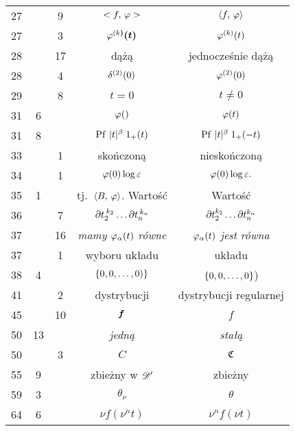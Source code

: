 \documentclass[a4paper,11pt]{article}
\begin{document}
\begin{center}
\begin{tabular}{|c|c|c|c|c|}
    27  & &  9 & $< f,\, \varphi >$ & $\langle  f ,\,  \varphi  \rangle$ \\
    27  & &  3 & $\varphi^{ ( k \boldsymbol{ ) } }\boldsymbol{ ( t ) } $
           & $\varphi^{ ( k ) }( t )$ \\
    28  & & 17 & dążą & jednocześnie dążą \\
    28  & &  4 & $\delta^{ ( 2 ) }( 0 )$ & $\varphi^{ ( 2 ) }( 0 )$ \\
    29  & &  8 & $t = 0$ & $t \neq 0$ \\
    31  &  6 & & $\varphi( )$ & $\varphi( t )$ \\
    31  &  8 & & $\mathrm{Pf}\, \, | t |^{ \beta } \; 1_{ + }( t )$
           & $\mathrm{Pf}\, \, | t |^{ \beta } \; 1_{ + }( -t )$ \\
    33  & &  1 & skończoną & nieskończoną \\
    34  & &  1 & $\varphi( 0 ) \log\varepsilon$ & $\varphi( 0 ) \log\varepsilon.$ \\
    35  &  1 & & tj.~$\langle  B ,\,  \varphi  \rangle$. Wartość & Wartość \\
    36  & &  7 & $\partial t_{ 2 }^{ \: k_{ 2 } } \ldots \partial t_{ n }^{ \: k_{ n } }$
           & $\partial t_{ 2 }^{ k_{ 2 } } \ldots \partial t_{ n }^{ k_{ n } }$ \\
    37  & & 16 & \emph{mamy $\varphi_{ \alpha }( t )$ równe}
           & \emph{$\varphi_{ \alpha }( t )$ jest równa} \\
    37  & &  1 & wyboru układu & układu \\
    38  &  4 & & $\{ 0, 0, \ldots, 0 ) \}$ & $\{ 0, 0, \ldots, 0 \}$) \\
    41  & &  2 & dystrybucji & dystrybucji regularnej \\
    45  & & 10 & $\boldsymbol{f}$ & $f$ \\
    50  & 13 & & \emph{jedną} & \emph{stałą} \\
    50  & &  3 & $C$ & $\mathfrak{C}$ \\
    55  &  9 & & zbieżny w $\mathcal{D}'$ & zbieżny \\
    59  &  3 & & $\theta_{ \nu }$ & $\theta$ \\
    64  &  6 & & $\nu f( \nu^{ n } t )$ & $\nu^{ n } f( \nu t )$ \\
    \hline
  \end{tabular}
\end{center}
\end{document}
